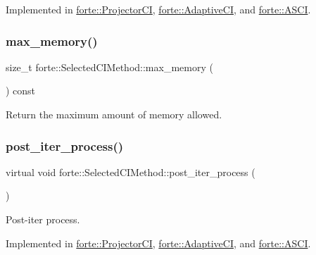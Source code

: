 Implemented in \mbox{\hyperlink{classforte_1_1_projector_c_i_ad4774357cde1564dd6a2f17bb0452174}{forte\+::\+Projector\+CI}}, \mbox{\hyperlink{classforte_1_1_adaptive_c_i_a770022fec5ed4819e58670155e7fd5fc}{forte\+::\+Adaptive\+CI}}, and \mbox{\hyperlink{classforte_1_1_a_s_c_i_aa81094a460d7922927d4ff9f14929ab8}{forte\+::\+A\+S\+CI}}.

\mbox{\label{classforte_1_1_selected_c_i_method_ac7c6e32a3877bc8d94e0a17261a4f3c6}} 
\subsubsection{\texorpdfstring{max\+\_\+memory()}{max\_memory()}}
{\footnotesize\ttfamily size\+\_\+t forte\+::\+Selected\+C\+I\+Method\+::max\+\_\+memory (\begin{DoxyParamCaption}{ }\end{DoxyParamCaption}) const}



Return the maximum amount of memory allowed. 

\mbox{\label{classforte_1_1_selected_c_i_method_a23ea3389ac1c62dee811decc5bea507f}} 
\subsubsection{\texorpdfstring{post\+\_\+iter\+\_\+process()}{post\_iter\_process()}}
{\footnotesize\ttfamily virtual void forte\+::\+Selected\+C\+I\+Method\+::post\+\_\+iter\+\_\+process (\begin{DoxyParamCaption}{ }\end{DoxyParamCaption})\hspace{0.3cm}{\ttfamily [pure virtual]}}



Post-\/iter process. 



Implemented in \mbox{\hyperlink{classforte_1_1_projector_c_i_a9d7d491168cfe782b51d3393f4b77630}{forte\+::\+Projector\+CI}}, \mbox{\hyperlink{classforte_1_1_adaptive_c_i_aebb7aa6e06ce5b45c4c5b2da1b1703c1}{forte\+::\+Adaptive\+CI}}, and \mbox{\hyperlink{classforte_1_1_a_s_c_i_a0088675b12258f127476e15226ba822f}{forte\+::\+A\+S\+CI}}.

